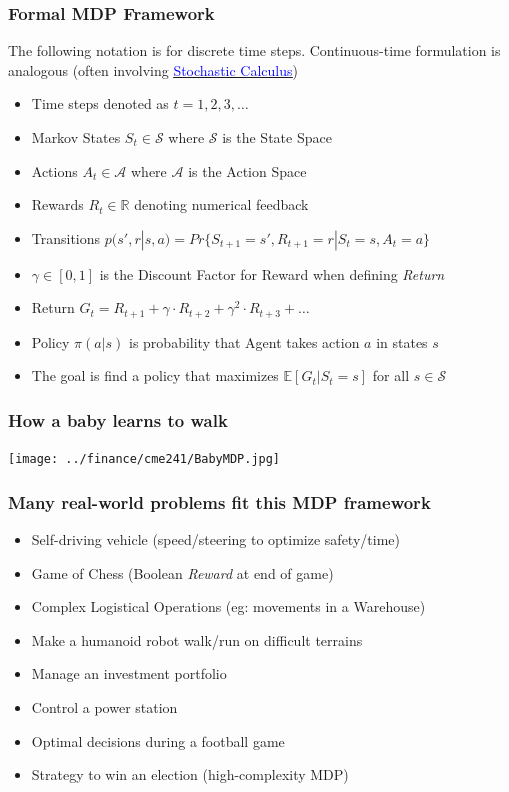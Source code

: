 \documentclass[handout]{beamer}
\begin{document}
\begin{frame}
\frametitle{Formal MDP Framework}
The following notation is for discrete time steps. Continuous-time formulation is analogous (often involving
\href{https://github.com/coverdrive/technical-documents/blob/master/finance/cme241/StochasticCalculusFoundations.pdf}{\underline{\textcolor{blue}{Stochastic Calculus}}})
\pause
\begin{itemize}[<+->]
\item Time steps denoted as $t = 1, 2, 3, \ldots$
\item Markov States $S_t \in \mathcal{S}$ where $\mathcal{S}$ is the State Space
\item Actions $A_t \in \mathcal{A}$ where $\mathcal{A}$ is the Action Space
\item Rewards $R_t \in \mathbb{R}$ denoting numerical feedback\
\item Transitions $p(s',r|s,a) = Pr\{S_{t+1}=s',R_{t+1}=r|S_t=s,A_t=a\}$
\item $\gamma \in [0,1]$ is the Discount Factor for Reward when defining {\em Return}
\item Return $G_t = R_{t+1} + \gamma \cdot R_{t+2} + \gamma^2 \cdot R_{t+3} + \ldots$
\item Policy $\pi(a|s)$ is probability that Agent takes action $a$ in states $s$
\item The goal is find a policy that maximizes  $\mathbb{E}[G_t|S_t = s]$ for all $s \in \mathcal{S}$
\end{itemize}
\end{frame}

\begin{frame}
\frametitle{How a baby learns to walk}
\texttt{[image: ../finance/cme241/BabyMDP.jpg]}
\end{frame}

\begin{frame}
\frametitle{Many real-world problems fit this MDP framework}
\pause
\begin{itemize}[<+->]
\item Self-driving vehicle (speed/steering to optimize safety/time)
\item Game of Chess (Boolean {\em Reward} at end of game)
\item Complex Logistical Operations (eg: movements in a Warehouse)
\item Make a humanoid robot walk/run on difficult terrains
\item Manage an investment portfolio
\item Control a power station
\item Optimal decisions during a football game
\item Strategy to win an election (high-complexity MDP)
\end{itemize}
\end{frame}
\end{document}
